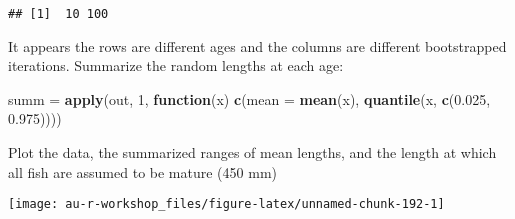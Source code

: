 \documentclass[]{book}
\newenvironment{Shaded}{\begin{snugshade}}{\end{snugshade}}
\newcommand{\KeywordTok}[1]{\textcolor[rgb]{0.13,0.29,0.53}{\textbf{#1}}}
\newcommand{\DataTypeTok}[1]{\textcolor[rgb]{0.13,0.29,0.53}{#1}}
\newcommand{\DecValTok}[1]{\textcolor[rgb]{0.00,0.00,0.81}{#1}}
\newcommand{\FloatTok}[1]{\textcolor[rgb]{0.00,0.00,0.81}{#1}}
\newcommand{\StringTok}[1]{\textcolor[rgb]{0.31,0.60,0.02}{#1}}
\newcommand{\ControlFlowTok}[1]{\textcolor[rgb]{0.13,0.29,0.53}{\textbf{#1}}}
\newcommand{\OperatorTok}[1]{\textcolor[rgb]{0.81,0.36,0.00}{\textbf{#1}}}
\newcommand{\NormalTok}[1]{#1}
\theoremstyle{definition}
\theoremstyle{definition}
\theoremstyle{definition}
\theoremstyle{remark}
\begin{document}
\begin{verbatim}
## [1]  10 100
\end{verbatim}

It appears the rows are different ages and the columns are different
bootstrapped iterations. Summarize the random lengths at each age:

\begin{Shaded}
\begin{Highlighting}[]
\NormalTok{summ =}\StringTok{ }\KeywordTok{apply}\NormalTok{(out, }\DecValTok{1}\NormalTok{, }\ControlFlowTok{function}\NormalTok{(x) }\KeywordTok{c}\NormalTok{(}\DataTypeTok{mean =} \KeywordTok{mean}\NormalTok{(x), }\KeywordTok{quantile}\NormalTok{(x, }\KeywordTok{c}\NormalTok{(}\FloatTok{0.025}\NormalTok{, }\FloatTok{0.975}\NormalTok{))))}
\end{Highlighting}
\end{Shaded}

Plot the data, the summarized ranges of mean lengths, and the length at
which all fish are assumed to be mature (450 mm)

\begin{Shaded}
\end{Shaded}

\begin{center}\texttt{[image: au-r-workshop\_files/figure-latex/unnamed-chunk-192-1]} \end{center}
\end{document}
